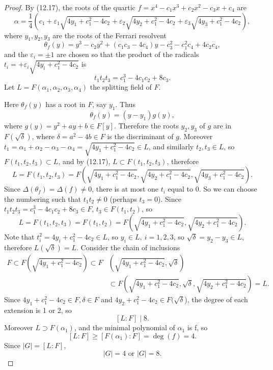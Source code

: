 \documentclass[11pt,a4paper]{article}
\begin{document}
\begin{proof}
By (12.17), the roots of the quartic $f =x^4 -c_1x^3 + c_2 x^2 - c_3x + c_4$ are
$$\alpha = \frac{1}{4}\left ( c_1 + \varepsilon_1 \sqrt{ 4y_1 + c_1^2 - 4 c_2} + \varepsilon_2 \sqrt{ 4y_2 + c_1^2 - 4 c_2} + \varepsilon_3 \sqrt{ 4y_3 + c_1^2 - 4 c_2}\right ),$$
where $y_1,y_2,y_3$ are the roots of the Ferrari resolvent 
$$\theta_f(y) = y^3 - c_2y^2+(c_1c_3-4c_4) y - c_3^2 -c_1^2c_4 + 4 c_2c_4,$$
and the $\varepsilon_i = \pm 1$ are chosen so that the product of the radicals $t_i = + \varepsilon_i \sqrt{ 4y_i + c_1^2 - 4 c_2}$ is
$$t_1t_2t_3 = c_1^3 - 4 c_1 c_2 + 8c_3.$$
Let $L = F(\alpha_1,\alpha_2,\alpha_3,\alpha_4)$ the splitting field of $F$.

Here $\theta_f(y)$ has a root in $F$, say $y_1$. Thus
$$\theta_f(y) =(y-y_1)g(y),$$
where $g(y) = y^2 + a y +b \in F[y].$
Therefore the roots $y_2,y_3$ of $g$ are in $F(\sqrt{\delta})$, where $\delta = a^2 - 4b \in F$ is the discriminant of $g$.
Moreover $t_1 = \alpha_1+\alpha_2-\alpha_3-\alpha_4  = \sqrt{ 4y_1 + c_1^2 - 4 c_2} \in L$, and similarly $t_2,t_3 \in L$, so $F(t_1,t_2,t_3) \subset L$, and by (12.17), $L \subset F(t_1,t_2,t_3)$, therefore
$$L = F(t_1,t_2,t_3) = F\left(\sqrt{ 4y_1 + c_1^2 - 4 c_2}, \sqrt{ 4y_2 + c_1^2 - 4 c_2},\sqrt{ 4y_3 + c_1^2 - 4 c_2}\right).$$
Since $\Delta(\theta_f) = \Delta(f) \ne 0$, there is at most one $t_i$ equal to $0$. So we can choose the numbering such that $t_1t_2 \ne 0$ (perhaps $t_3 = 0$). Since $t_1t_2t_3 = c_1^3 - 4 c_1 c_2 + 8c_3 \in F$, $t_3 \in F(t_1,t_2)$, so
$$L = F(t_1,t_2,t_3) = F(t_1,t_2) =F\left(\sqrt{ 4y_1 + c_1^2 - 4 c_2}, \sqrt{ 4y_2 + c_1^2 - 4 c_2}\right).$$
Note that $t_i^2 = 4y_i + c_1^2 - 4 c_2 \in L$, so $y_i \in L,\  i = 1,2,3$, so  $\sqrt{\delta} = y_2- y_3 \in L$, therefore $L(\sqrt{\delta}) = L$.
Consider the chain of inclusions
\begin{align*}
F \subset F\left(\sqrt{4y_1+c_1^2-4c_2}\right) \subset  F&\left(\sqrt{4y_1+c_1^2-4c_2},\sqrt{\delta}\right)\\
& \subset F\left(\sqrt{4y_1+c_1^2-4c_2}, \sqrt{\delta},\sqrt{4y_2+c_1^2-4c_2} \right) =L.
\end{align*}
 Since $4y_1+c_1^2-4c_2 \in F, \delta \in F$ and $4y_2+c_1^2-4c_2 \in F(\sqrt{\delta}$), the degree of each extension is 1 or 2, so 
$$[L:F] \mid 8.$$
Moreover $L \supset F(\alpha_1)$, and the minimal polynomial of $\alpha_1$ is f, so $$[L:F] \geq [F(\alpha_1):F] = \deg(f) = 4.$$ Since $|G| = [L:F]$,
$$|G| = 4 \text{ or } |G| = 8.$$
\end{proof}
\end{document}
